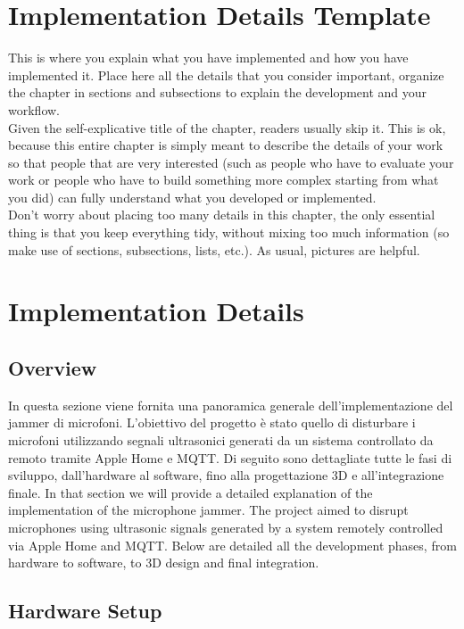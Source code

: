 \chapter{Implementation Details Template}
This is where you explain what you have implemented and how you have implemented it. Place here all the details that you consider important, organize the chapter in sections and subsections to explain the development and your workflow.\\Given the self-explicative title of the chapter, readers usually skip it. This is ok, because this entire chapter is simply meant to describe the details of your work so that people that are very interested (such as people who have to evaluate your work or people who have to build something more complex starting from what you did) can fully understand what you developed or implemented.\\Don't worry about placing too many details in this chapter, the only essential thing is that you keep everything tidy, without mixing too much information (so make use of sections, subsections, lists, etc.). As usual, pictures are helpful.
\chapter{Implementation Details}

\section{Overview}
In questa sezione viene fornita una panoramica generale dell'implementazione del jammer di microfoni. L'obiettivo del progetto è stato quello di disturbare i microfoni utilizzando segnali ultrasonici generati da un sistema controllato da remoto tramite Apple Home e MQTT. Di seguito sono dettagliate tutte le fasi di sviluppo, dall'hardware al software, fino alla progettazione 3D e all'integrazione finale.
In that section we will provide a detailed explanation of the implementation of the microphone jammer. The project aimed to disrupt microphones using ultrasonic signals generated by a system remotely controlled via Apple Home and MQTT.
Below are detailed all the development phases, from hardware to software, to 3D design and final integration.


\section{Hardware Setup}


